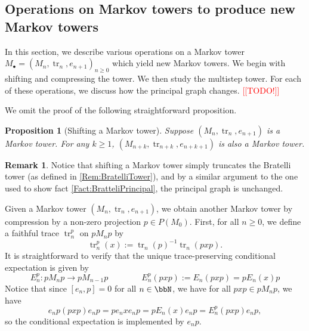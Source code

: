 \documentclass[11pt]{article}
\theoremstyle{plain}
\newtheorem{prop}[thm]{Proposition}
\theoremstyle{definition}
\newtheorem{remark}[thm]{Remark}
\DeclareMathOperator{\tr}{tr}
\newcommand{\nn}[1]{\textcolor{red}{[[#1]]}}
\begin{document}
\subsection{Operations on Markov towers to produce new Markov towers}
\label{sec:OperationsOnMarkovTowers}

In this section, we describe various operations on a Markov tower $M_\bullet = (M_n, \tr_n, e_{n+1})_{n\geq 0}$ which yield new Markov towers.
We begin with shifting and compressing the tower.
We then study the multistep tower.
For each of these operations, we discuss how the principal graph changes. 
\nn{TODO!} %

We omit the proof of the following straightforward proposition.

\begin{prop}[Shifting a Markov tower]
\label{prop:ShiftMarkovTower}
Suppose $(M_n, \tr_n, e_{n+1})$ is a Markov tower.
For any $k\geq 1$, $(M_{n+k}, \tr_{n+k}, e_{n+k+1})$ is also a Markov tower.
\end{prop}

\begin{remark}
Notice that shifting a Markov tower simply truncates the Bratelli tower (as defined in \ref{Rem:BratelliTower}), and by a similar argument to the one used to show fact \ref{Fact:BratteliPrincipal}, the principal graph is unchanged.
\end{remark}

Given a Markov tower $(M_n,\tr_n, e_{n+1})$, we obtain another Markov tower by compression by a non-zero projection $p\in P(M_0)$.
First, for all $n\geq 0$, we define a faithful trace $\tr_n^p$ on $pM_n p$ by
\begin{equation}
\label{eq:CompressedTrace}
\tr^p_n(x) := \tr_n(p)^{-1}\tr_n(pxp).
\end{equation}
It is straightforward to verify that the unique trace-preserving conditional expectation is given by 
\begin{equation}
\label{eq:CompressedConditionalExpectation}
E^p_n : pM_np \to pM_{n-1}p
\qquad
\qquad
E^p_n(pxp) := E_n(pxp) = pE_n(x)p
\end{equation}
Notice that since $[e_n,p] = 0$ for all $n\in \bbN$, we have for all $pxp \in pM_n p$, we have 
\begin{equation}
\label{eq:CompressionImplementsConditionalExpectation}
e_np (pxp) e_np = p e_nxe_np = pE_n(x)e_np = E_n^p(pxp)e_np,
\end{equation}
so the conditional expectation is implemented by $e_np$.
\end{document}
